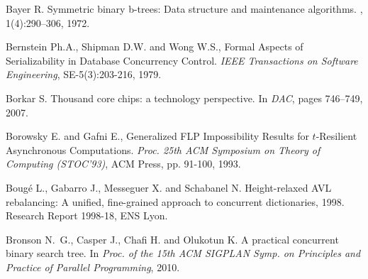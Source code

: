 \begin{thebibliography}{99}
{
Bayer R.
\newblock Symmetric binary b-trees: Data structure and maintenance algorithms.
, 1(4):290--306, 1972.



Bernstein Ph.A., Shipman D.W. and Wong W.S., 
Formal Aspects of Serializability in Database Concurrency Control. 
{\it IEEE Transactions on Software Engineering}, SE-5(3):203-216, 1979. 


Borkar S.
\newblock Thousand core chips: a technology perspective.
\newblock In {\em DAC}, pages 746--749, 2007.





Borowsky E. and Gafni E., 
Generalized FLP Impossibility Results for $t$-Resilient Asynchronous
Computations.
{\it Proc. 25th ACM  Symposium on Theory of Computing (STOC'93)}, 
ACM Press, pp. 91-100, 1993.



Boug\'e L., Gabarro J., Messeguer X. and Schabanel N.
\newblock Height-relaxed {AVL} rebalancing: A unified, fine-grained approach to
  concurrent dictionaries, 1998.
\newblock Research Report 1998-18, ENS Lyon.






Bronson N.~G., Casper J., Chafi H. and Olukotun K.
\newblock A practical concurrent binary search tree.
\newblock In {\em Proc. of the 15th ACM SIGPLAN Symp. on Principles and
  Practice of Parallel Programming}, 2010.




}
\end{thebibliography}
